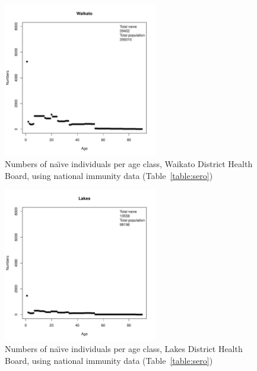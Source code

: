 \documentclass{article}
\begin{document}
\begin{figure}[H]
     \begin{center}
     \includegraphics[width=0.6\textwidth]{dhb5.pdf}
     \end{center}
     \caption{Numbers of na\"{\i}ve individuals per age class, Waikato District Health Board, using national immunity data (Table~\autoref{table:sero})}
     \label{fig:Waikato}
\end{figure}

\begin{figure}[H]
     \begin{center}
     \includegraphics[width=0.6\textwidth]{dhb6.pdf}
     \end{center}
     \caption{Numbers of na\"{\i}ve individuals per age class, Lakes District Health Board, using national immunity data (Table~\autoref{table:sero})}
     \label{fig:Lakes}
\end{figure}
\end{document}
